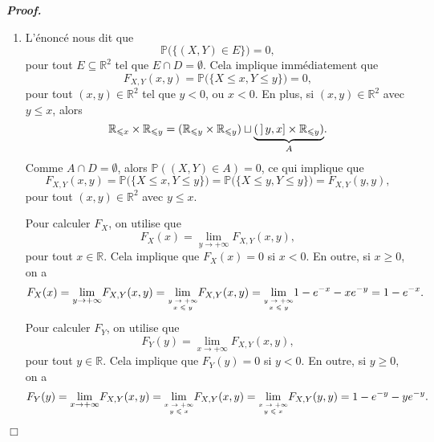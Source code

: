 \documentclass[11pt,a4paper]{article}
\newcommand{\RR}{\mathbb{R}}
\newenvironment{preuve}[1][]
{\vskip 2mm  \noindent\emph{\bf Proof#1. }}{$\Box$ \vskip 2mm}
\let\geq\geqslant
\let\leq\leqslant
\begin{document}
		\begin{preuve} 
			\begin{enumerate}
				\item L'énoncé nous dit que 
				\[     \mathbb{P}\Big(\big\{(X,Y) \in E \big\} \Big) = 0,     \]
				pour tout $E \subseteq \RR^{2}$ tel que $E \cap D = \emptyset$. 
				Cela implique immédiatement que 
				\[     F_{X,Y}(x,y) = \mathbb{P}\big(\{ X \leq x ,Y \leq y \} \big) = 0,     \]
				pour tout $(x,y) \in \RR^{2}$ tel que $y < 0$, ou $x < 0$. 
				En plus, si $(x,y) \in \RR^{2}$ avec $y \leq x$, alors 
				\[     \RR_{\leq x} \times \RR_{\leq y} =  (\RR_{\leq y} \times \RR_{\leq y}) \sqcup \underset{A}{\underbrace{(\hskip 0.6mm ] \hskip 0.6mm y,x] \times \RR_{\leq y})}}.     \]
				Comme $A \cap D = \emptyset$, alors $\mathbb{P}((X,Y) \in A) = 0$, ce qui implique que 
				\[     F_{X,Y}(x,y) = \mathbb{P}\big(\{ X \leq x ,Y \leq y \} \big) = \mathbb{P}\big(\{ X \leq y ,Y \leq y \} \big) = F_{X,Y}(y,y),     \]
				pour tout $(x,y) \in \RR^{2}$ avec $y \leq x$. 
				
				Pour calculer $F_{X}$, on utilise que 
				\[     F_{X}(x) = \underset{y \rightarrow + \infty}{\lim} F_{X,Y}(x,y),     \]
				pour tout $x\in \RR$. 
				Cela implique que $F_{X}(x) = 0$ si $x < 0$.
				En outre, si $x \geq 0$, on a 
				\[     F_{X}(x) = \underset{y \rightarrow + \infty}{\lim} F_{X,Y}(x,y) = \underset{\text{\begin{tiny}$\begin{matrix}y \rightarrow + \infty\\ x \leq y\end{matrix}$\end{tiny}}}{\lim} F_{X,Y}(x,y) = \underset{\text{\begin{tiny}$\begin{matrix}y \rightarrow + \infty\\ x \leq y \end{matrix}$\end{tiny}}}{\lim} 1-e^{-x}-xe^{-y} = 1 - e^{-x}.   \]
				Pour calculer $F_{Y}$, on utilise que 
				\[     F_{Y}(y) = \underset{x \rightarrow + \infty}{\lim} F_{X,Y}(x,y),     \]
				pour tout $y \in \RR$. 
				Cela implique que $F_{Y}(y) = 0$ si $y < 0$.
				En outre, si $y \geq 0$, on a 
				\[     F_{Y}(y) = \underset{x \rightarrow + \infty}{\lim} F_{X,Y}(x,y) = \underset{\text{\begin{tiny}$\begin{matrix}x \rightarrow + \infty\\ y \leq x\end{matrix}$\end{tiny}}}{\lim} F_{X,Y}(x,y) = \underset{\text{\begin{tiny}$\begin{matrix}x \rightarrow + \infty\\ y \leq x\end{matrix}$\end{tiny}}}{\lim} F_{X,Y}(y,y) = 1-e^{-y}- y e^{-y}.  \]
				

\end{enumerate}
\end{preuve}
\end{document}
